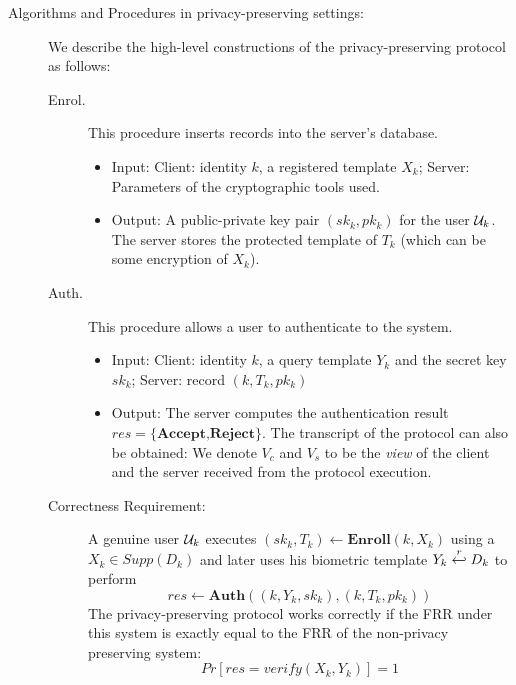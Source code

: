 \begin{description}
\item[Algorithms and Procedures in privacy-preserving settings:] We describe the
  high-level constructions of the privacy-preserving protocol as follows:
  \begin{description}
  \item[Enrol.] This procedure inserts records into the server's database.
    \begin{itemize}
    \item Input: Client: identity $k$, a registered template $X_k$; Server:
      Parameters of the cryptographic tools used.
    \item Output: A public-private key pair $(sk_k, pk_k)$ for the user
      $\mathcal{U}_k$. The server stores the protected template of $T_k$ (which can be
      some encryption of $X_k$).
    \end{itemize}
  \item[Auth.] This procedure allows a user to authenticate to the system.
    \begin{itemize}
    \item Input: Client: identity $k$, a query template $Y_k$ and the secret key
      $sk_k$; Server: record $(k, T_k, pk_k)$
    \item Output: The server computes the authentication result
      $res=\{\textbf{Accept,Reject}\}$. The transcript of the protocol can also
      be obtained: We denote \(V_{c}\) and \(V_{s}\) to be the \textit{view} of
      the client and the server received from the protocol execution.
    \end{itemize}

  \item[Correctness Requirement:] A genuine user $\mathcal{U}_k$ executes
    $(sk_k, T_k) \gets \mathbf{Enroll}(k, X_k)$ using a $X_k \in Supp(D_k)$ and
    later uses his biometric template $Y_k \stackrel{r}{\hookleftarrow} D_k$ to perform
    $$res \gets \mathbf{Auth}( (k, Y_k, sk_k), (k, T_k, pk_k))$$
    The privacy-preserving protocol works correctly if the FRR under this system
    is exactly equal to the FRR of the non-privacy preserving system:
    \[
      Pr[res = verify(X_k,Y_k)] = 1
    \]
  \end{description}
\end{description}

